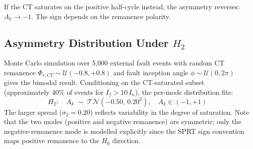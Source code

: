 \documentclass[11pt, a4paper]{article}
\newcommand{\Ak}{A_k}
\newcommand{\TN}[2]{\mathcal{TN}(#1,\,#2)}
\begin{document}
If the CT saturates on the positive half-cycle instead, the asymmetry reverses:
$\Ak \to -1$.  The sign depends on the remanence polarity.

\subsection{Asymmetry Distribution Under $H_2$}

Monte Carlo simulation over 5{,}000 external fault events with random CT
remanence $\Phi_{r,CT} \sim \mathcal{U}(-0.8, +0.8)$ and fault inception angle
$\phi \sim \mathcal{U}(0, 2\pi)$ gives the bimodal result.  Conditioning on
the CT-saturated subset (approximately 40\% of events for
$I_f > 10\,I_n$), the per-mode distribution fits:
\begin{equation}
  \boxed{H_2:\quad \Ak \;\sim\; \TN{-0.50}{0.20^2},\quad \Ak \in (-1,+1)}
  \label{eq:H2_dist}
\end{equation}
The larger spread ($\sigma_2 = 0.20$) reflects variability in the degree of
saturation.  Note that the two modes (positive and negative remanence) are
symmetric; only the negative-remanence mode is modelled explicitly since the
SPRT sign convention maps positive remanence to the $H_0$ direction.
\end{document}
